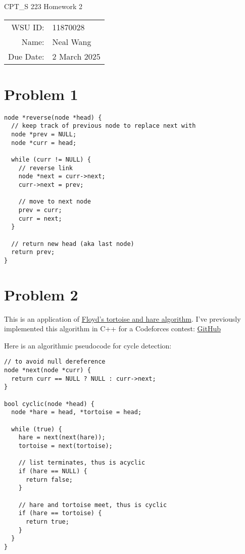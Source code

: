 \documentclass[12pt]{article}
\theoremstyle{definition}
\begin{document}
\begin{center}
  {\Large CPT\_S 223 Homework 2}
  $ $\\
  $ $\\
  \begin{tabular}{rl}
    WSU ID: & 11870028 \\
    Name: & Neal Wang \\
    Due Date: & 2 March 2025
  \end{tabular}
\end{center}

\section{Problem 1}

\begin{verbatim}
node *reverse(node *head) {
  // keep track of previous node to replace next with
  node *prev = NULL;
  node *curr = head;

  while (curr != NULL) {
    // reverse link
    node *next = curr->next;
    curr->next = prev;

    // move to next node
    prev = curr;
    curr = next;
  }

  // return new head (aka last node)
  return prev;
}
\end{verbatim}

\newpage

\section{Problem 2}

This is an application of
\href{https://en.wikipedia.org/wiki/Cycle_detection#Floyd's_tortoise_and_hare}
{Floyd's tortoise and hare algorithm}. I've previously implemented
this algorithm in C++ for a Codeforces contest:
\href{https://github.com/mathletedev/cp/blob/main/Codeforces/1137D.cpp}{GitHub}

Here is an algorithmic pseudocode for cycle detection:

\begin{verbatim}
// to avoid null dereference
node *next(node *curr) {
  return curr == NULL ? NULL : curr->next;
}

bool cyclic(node *head) {
  node *hare = head, *tortoise = head;

  while (true) {
    hare = next(next(hare));
    tortoise = next(tortoise);

    // list terminates, thus is acyclic
    if (hare == NULL) {
      return false;
    }

    // hare and tortoise meet, thus is cyclic
    if (hare == tortoise) {
      return true;
    }
  }
}
\end{verbatim}
\end{document}
